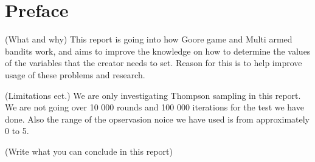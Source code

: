 \chapter*{Preface}
(What and why)
This report is going into how Goore game and Multi armed bandits work,
and aims to improve the knowledge on how to determine the values of the 
variables that the creator needs to set. Reason for this is to help improve
usage of these problems and research.

(Limitations ect.)
We are only investigating Thompson sampling in this report. We are not going 
over 10 000 rounds and 100 000 iterations for the test we have done. Also the
range of the opservasion noice we have used is from approximately 0 to 5.

(Write what you can conclude in this report)